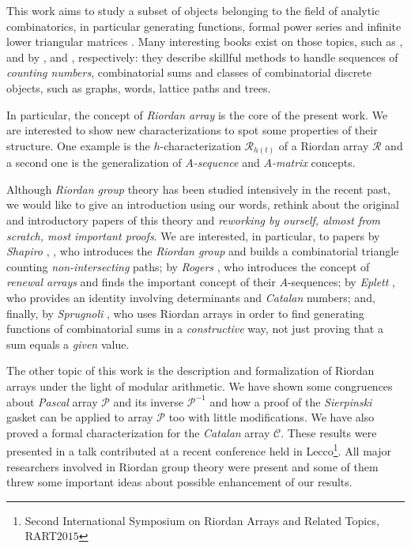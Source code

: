 
This work aims to study
a subset of objects belonging to the field of analytic combinatorics, in
particular generating functions, formal power series and infinite lower
triangular matrices . Many interesting books exist on those topics, such as
\cite{Flajolet:2009:AC:1506267}, \cite{Knuth:1998:ACP:521463} and
\cite{Graham:1994:CMF:562056} by \citeauthor{Flajolet:2009:AC:1506267},
\citeauthor{Knuth:1998:ACP:521463} and \citeauthor{Graham:1994:CMF:562056},
respectively: they describe skillful methods to handle sequences of
\emph{counting numbers}, combinatorial sums and classes of combinatorial
discrete objects, such as graphs, words, lattice paths and trees. 

In particular, the concept of \emph{Riordan array} is the core of the present
work.  We are interested to show new characterizations to spot some properties
of their structure. One example is the $h$-characterization
$\mathcal{R}_{h(t)}$ of a Riordan array $\mathcal{R}$ and a second one is the
generalization of \textit{$A$-sequence} %
and
\textit{$A$-matrix} %
concepts.

Although \emph{Riordan group} theory has been studied intensively in the recent past, we would
like to give an introduction using our words, rethink about the original and
introductory papers of this theory and \emph{reworking by ourself, almost from
scratch, most important proofs}.  We are interested, in particular, to papers
by \emph{Shapiro} \cite{shapiro:1976}, \cite{shapiro:1991}, who introduces the
\emph{Riordan group} and builds a combinatorial triangle counting
\emph{non-intersecting} paths; by \emph{Rogers} \cite{rogers:1977}, who
introduces the concept of \emph{renewal arrays} and finds the important concept
of their $A$-sequences; by \emph{Eplett} \cite{eplett:1979}, who provides an
identity involving determinants and \emph{Catalan} numbers; and, finally, by
\emph{Sprugnoli} \cite{sprugnoli:1991}, who uses Riordan arrays in order to
find generating functions of combinatorial sums in a \emph{constructive} way,
not just proving that a sum equals a \emph{given} value.

The other topic of 
this work is the description and formalization of Riordan arrays under the
light of modular arithmetic. We have shown some congruences about \emph{Pascal}
array $\mathcal{P}$ and its inverse $\mathcal{P}^{-1}$ and how a proof of the
\emph{Sierpinski} gasket can be applied to array $\mathcal{P}$ too with little
modifications. We have also proved a formal characterization for the
\emph{Catalan} array $\mathcal{C}$. These results were presented in a talk
contributed at a recent conference held in Lecco\footnote{Second International
Symposium on Riordan Arrays and Related Topics, RART$2015$}.  All major
researchers involved in Riordan group theory were present and some of them
threw some important ideas about possible enhancement of our results.  

